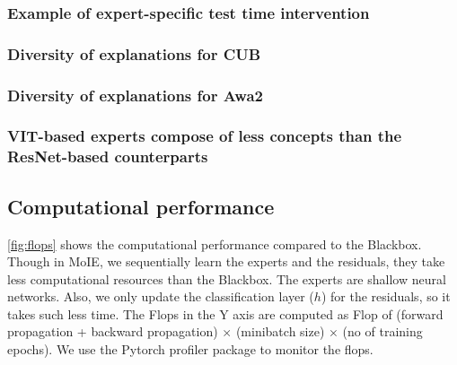 \documentclass{article}
\theoremstyle{plain}
\theoremstyle{definition}
\theoremstyle{remark}
\begin{document}
% 

% 

% 

\subsubsection{Example of expert-specific test time intervention}
\label{app:tti_qual}


\subsubsection{Diversity of explanations for CUB}
\label{app:local_cub}



\subsubsection{Diversity of explanations for Awa2}
\label{app:local_awa2}


\subsubsection{VIT-based experts compose of less concepts than the ResNet-based counterparts}
\label{app:comparison_arch}


\subsection{Computational performance }
\label{app:validate_concepts}
\cref{fig:flops} shows the computational performance compared to the Blackbox. Though in MoIE, we sequentially learn the experts and the residuals, they take less computational resources than the Blackbox. The experts are shallow neural networks. Also, we only update the classification layer ($h$) for the residuals, so it takes such less time. The Flops in the Y axis are computed as Flop of (forward propagation + backward propagation) $\times$ (minibatch size) $\times$ (no of training epochs).
We use the Pytorch profiler package to monitor the flops.
\end{document}
